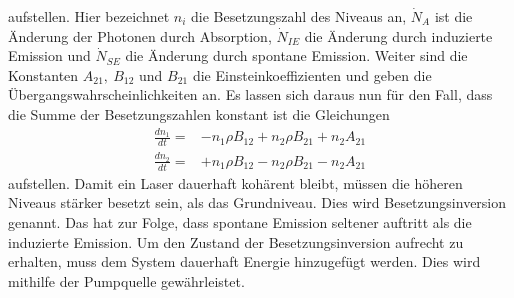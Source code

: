 aufstellen. Hier bezeichnet $n_i$ die Besetzungszahl des Niveaus an, $\dot{N}_A$ ist die Änderung der Photonen durch Absorption, $\dot{N}_{IE}$ die Änderung durch induzierte Emission und $\dot{N}_{SE}$ die Änderung durch spontane Emission.
Weiter sind die Konstanten $A_{21},\ B_{12}$ und $B_{21}$ die Einsteinkoeffizienten und geben die Übergangswahrscheinlichkeiten an.
Es lassen sich daraus nun für den Fall, dass die Summe der Besetzungszahlen konstant ist die Gleichungen
\begin{align}
	\frac{dn_1}{dt}=&-n_1\rho B_{12}+n_2\rho B_{21}+n_2A_{21}\\
	\frac{dn_2}{dt}=&+n_1\rho B_{12}- n_2\rho B_{21}-n_2A_{21}
\end{align}
aufstellen.
Damit ein Laser dauerhaft kohärent bleibt, müssen die höheren Niveaus stärker besetzt sein, als das Grundniveau.
Dies wird Besetzungsinversion genannt. 
Das hat zur Folge, dass spontane Emission seltener auftritt als die induzierte  Emission.
Um den Zustand der Besetzungsinversion aufrecht zu erhalten, muss dem System dauerhaft Energie hinzugefügt werden.
Dies wird mithilfe der Pumpquelle gewährleistet.
